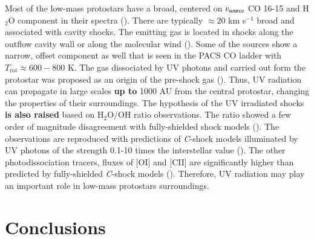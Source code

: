 \documentclass{aa}
\begin{document}
Most of the low-mass protostars have a broad, centered on $\varv_{\mathrm{source}}$ CO 16-15 and
H$_2$O component in their spectra (\citealt{Kri17}). There are typically $\approx 20$ km s$^{-1}$
broad and associated with cavity shocks. The emitting gas is located in shocks along the outflow
cavity wall or along the molecular wind (\citealt{Yva16}). Some of the sources show a
narrow, offset component as well that is seen in the PACS CO ladder with $T_\mathrm{rot} \approx
600-800$ K. The gas dissociated by UV photons and carried out form the protostar was proposed as an
origin of the pre-shock gas (\citealt{Kri17}). Thus, UV radiation can propagate in large
scales \textbf{up to} 1000 AU from the central protostar, changing the properties of their surroundings. The
hypothesis of the UV irradiated shocks \textbf{is also raised} based on H$_2$O/OH ratio observations. The
ratio showed a few order of magnitude disagreement with fully-shielded shock models
(\citealt{Kar14}). The observations are reproduced with predictions of \mbox{\textit{C}-shock} models
illuminated by UV photons of the strength 0.1-10 times the interstellar value (\citealt{Mel15}). The
other photodissociation tracers, fluxes of [OI] and [CII] are significantly higher than predicted by
fully-shielded \mbox{\textit{C}-shock} models (\citealt{Kar18}). Therefore, UV radiation may play
an important role in low-mass protostars surroundings.

\section{Conclusions}
\label{section:conclusions}
\end{document}
